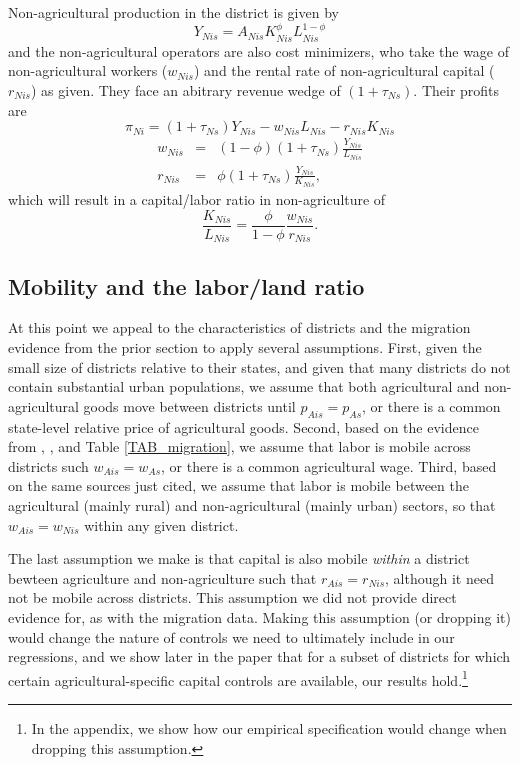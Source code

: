 \documentclass[11pt]{article}
\begin{document}
Non-agricultural production in the district is given by
\begin{equation}
	Y_{Nis} = A_{Nis} K_{Nis}^{\phi}L_{Nis}^{1-\phi} \label{EQ_nonag}
\end{equation}
and the non-agricultural operators are also cost minimizers, who take the wage of non-agricultural workers ($w_{Nis}$) and the rental rate of non-agricultural capital ($r_{Nis}$) as given. They face an abitrary revenue wedge of $(1+\tau_{Ns})$. Their profits are
\begin{equation}
	\pi_{Ni} = (1+\tau_{Ns}) Y_{Nis} - w_{Nis} L_{Nis} - r_{Nis} K_{Nis}
\end{equation}
\begin{eqnarray*}
    w_{Nis} &=& (1-\phi)(1+\tau_{Ns}) \frac{Y_{Nis}}{L_{Nis}} \\ 
    r_{Nis} &=& \phi (1+\tau_{Ns}) \frac{Y_{Nis}}{K_{Nis}},
\end{eqnarray*}
which will result in a capital/labor ratio in non-agriculture of
\begin{equation}
	\frac{K_{Nis}}{L_{Nis}} = \frac{\phi}{1-\phi} \frac{w_{Nis}}{r_{Nis}}. \label{EQ_KLnon}
\end{equation}

\subsection{Mobility and the labor/land ratio}
At this point we appeal to the characteristics of districts and the migration evidence from the prior section to apply several assumptions. First, given the small size of districts relative to their states, and given that many districts do not contain substantial urban populations, we assume that both agricultural and non-agricultural goods move between districts until $p_{Ais} = p_{As}$, or there is a common state-level relative price of agricultural goods. Second, based on the evidence from \cite{young2013inequality}, \cite{hklm2017}, and Table \ref{TAB_migration}, we assume that labor is mobile across districts such $w_{Ais} = w_{As}$, or there is a common agricultural wage. Third, based on the same sources just cited, we assume that labor is mobile between the agricultural (mainly rural) and non-agricultural (mainly urban) sectors, so that $w_{Ais} = w_{Nis}$ within any given district. 

The last assumption we make is that capital is also mobile \textit{within} a district bewteen agriculture and non-agriculture such that $r_{Ais} = r_{Nis}$, although it need not be mobile across districts. This assumption we did not provide direct evidence for, as with the migration data. Making this assumption (or dropping it) would change the nature of controls we need to ultimately include in our regressions, and we show later in the paper that for a subset of districts for which certain agricultural-specific capital controls are available, our results hold.\footnote{In the appendix, we show how our empirical specification would change when dropping this assumption.}
\end{document}
